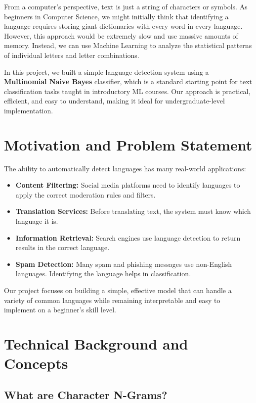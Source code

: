 \documentclass[conference]{IEEEtran}
\begin{document}
From a computer's perspective, text is just a string of characters or symbols. As beginners in Computer Science, we might initially think that identifying a language requires storing giant dictionaries with every word in every language. However, this approach would be extremely slow and use massive amounts of memory. Instead, we can use Machine Learning to analyze the statistical patterns of individual letters and letter combinations.

In this project, we built a simple language detection system using a \textbf{Multinomial Naive Bayes} classifier, which is a standard starting point for text classification tasks taught in introductory ML courses. Our approach is practical, efficient, and easy to understand, making it ideal for undergraduate-level implementation.

\section{Motivation and Problem Statement}

The ability to automatically detect languages has many real-world applications:

\begin{itemize}
    \item \textbf{Content Filtering:} Social media platforms need to identify languages to apply the correct moderation rules and filters.
    \item \textbf{Translation Services:} Before translating text, the system must know which language it is.
    \item \textbf{Information Retrieval:} Search engines use language detection to return results in the correct language.
    \item \textbf{Spam Detection:} Many spam and phishing messages use non-English languages. Identifying the language helps in classification.
\end{itemize}

Our project focuses on building a simple, effective model that can handle a variety of common languages while remaining interpretable and easy to implement on a beginner's skill level.

\section{Technical Background and Concepts}

\subsection{What are Character N-Grams?}
\end{document}
